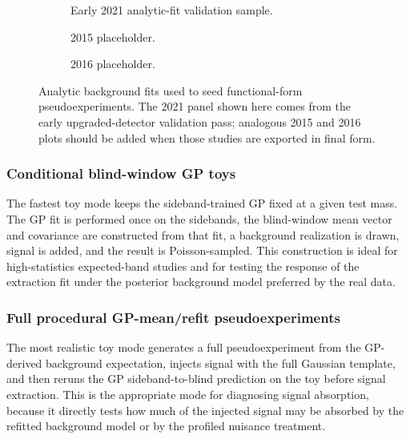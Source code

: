 \begin{figure}[H]
\centering
\begin{subfigure}[t]{0.32\linewidth}
  \centering
  \caption{Early 2021 analytic-fit validation sample.}
\end{subfigure}
\hfill
\begin{subfigure}[t]{0.32\linewidth}
  \centering
  \caption{2015 placeholder.}
\end{subfigure}
\hfill
\begin{subfigure}[t]{0.32\linewidth}
  \centering
  \caption{2016 placeholder.}
\end{subfigure}
\caption{Analytic background fits used to seed functional-form pseudoexperiments. The
2021 panel shown here comes from the early upgraded-detector validation pass; analogous
2015 and 2016 plots should be added when those studies are exported in final form.}
\label{fig:analytic-fit-toys}
\end{figure}

\subsubsection{Conditional blind-window GP toys}

The fastest toy mode keeps the sideband-trained GP fixed at a given test mass. The GP
fit is performed once on the sidebands, the blind-window mean vector and covariance are
constructed from that fit, a background realization is drawn, signal is added, and the
result is Poisson-sampled. This construction is ideal for high-statistics expected-band
studies and for testing the response of the extraction fit under the posterior
background model preferred by the real data.

\subsubsection{Full procedural GP-mean/refit pseudoexperiments}

The most realistic toy mode generates a full pseudoexperiment from the GP-derived
background expectation, injects signal with the full Gaussian template, and then reruns
the GP sideband-to-blind prediction on the toy before signal extraction. This is the
appropriate mode for diagnosing signal absorption, because it directly tests how much
of the injected signal may be absorbed by the refitted background model or by the
profiled nuisance treatment.

